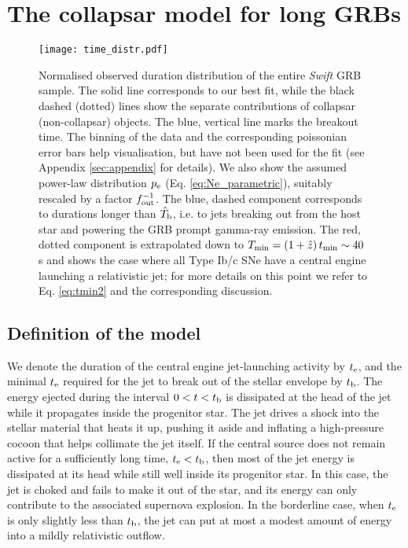 \documentclass[useAMS,usenatbib]{mn2e}
\begin{document}
\section{The collapsar model for long GRB\MakeLowercase{s}}
\label{sec:collapsar}

\begin{figure*}{\vspace{3mm}} 
\centering
\texttt{[image: time\_distr.pdf]}
\caption{Normalised observed duration distribution of the entire {\it Swift} GRB sample. The solid line corresponds to our best fit, while the black dashed (dotted) lines show the separate contributions of collapsar (non-collapsar) objects. The blue, vertical line marks the breakout time. The binning of the data and the corresponding poissonian error bars help visualisation, but have not been used for the fit (see Appendix \ref{sec:appendix} for details). We also show the assumed power-law distribution $p_{\rm e}$ (Eq. \ref{eq:Ne_parametric}), suitably rescaled by a factor $f_{\rm out}^{-1}$. The blue, dashed component corresponds to durations longer than $\hat{T}_{\rm b}$, i.e. to jets breaking out from the host star and powering the GRB prompt gamma-ray emission. The red, dotted component is extrapolated down to $T_{\rm min}=\left(1+\hat{z}\right)t_{\rm min}\sim 40\;$s and shows the case where all Type Ib/c SNe have a central engine launching a relativistic jet; for more details on this point we refer to Eq. \eqref{eq:tmin2} and the corresponding discussion.
}
\label{fig:distr}
\end{figure*}

\subsection{Definition of the model}

We denote the duration of the central engine jet-launching activity by $t_{\rm e}$, and the minimal $t_{\rm e}$ required for the jet to break out of the stellar envelope by $t_{\rm b}$. The energy ejected during the interval $0<t<t_{\rm b}$ is dissipated at the head of the jet while it propagates inside the progenitor star. The jet drives a shock into the stellar material that heats it up, pushing it aside and inflating a high-pressure cocoon that helps collimate the jet itself. If the central source does not remain active for a sufficiently long time, $t_{\rm e}<t_{\rm b}$, then most of the jet energy is dissipated at its head while still well inside its progenitor star. In this case, the jet is choked
and fails to make it out of the star, and its energy can only contribute to the associated supernova explosion. In the borderline case, when $t_{\rm e}$ is only slightly less than $t_{\rm b}$, the jet can put at most a modest amount of energy into a mildly relativistic outflow.
\end{document}
